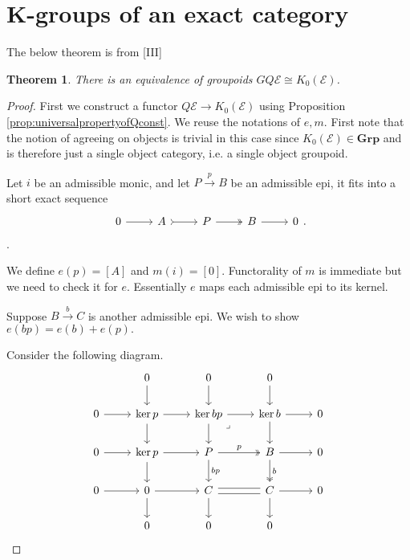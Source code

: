 \documentclass[12pt]{report}
\numberwithin{equation}{section}
\newtheorem{theorem}[dummy]{Theorem}
\begin{document}
		
		\section{K-groups of an exact category}
		
		The below theorem is from \cite{Goerss_Jardine_2009}[III]
		\begin{theorem}
			There is an equivalence of groupoids $GQ\mathcal{E} \cong K_0(\mathcal{E})$.
		\end{theorem}	
		\begin{proof}
			First we construct a functor \( Q\mathcal{E}\to K_0(\mathcal{E}) \) using Proposition \ref{prop:universalpropertyofQconst}. We reuse the notations of \( e,m \). First note that the notion of agreeing on objects is trivial in this case since \( K_0(\mathcal{E}) \in \mathbf{Grp} \) and is therefore just a single object category, i.e. a single object groupoid.
			 
			Let \( i \) be an admissible monic, and let \( P \xrightarrow{p}B \) be an admissible epi, it fits into a short exact sequence 
			\[\begin{tikzcd}
				0 & A & P & B & 0
				\arrow[from=1-1, to=1-2]
				\arrow[tail, from=1-2, to=1-3]
				\arrow[two heads, from=1-3, to=1-4]
				\arrow[from=1-4, to=1-5]
			\end{tikzcd}.\].
						
			We define \( e(p)=[A] \) and \( m(i)=[0] \). Functorality of \( m \) is immediate but we need to check it for \( e \). Essentially \( e \) maps each admissible epi to its kernel.
			
			
			
			Suppose \( B \xrightarrow{b}C \) is another admissible epi. We wish to show \( e(bp)=e(b)+e(p). \)
			
			Consider the following diagram.
			\[\begin{tikzcd}
				& 0 & 0 & 0 \\
				0 & {\ker p} & {\ker bp} & {\ker b} & 0 \\
				0 & {\ker p} & P & B & 0 \\
				0 & 0 & C & C & 0 \\
				& 0 & 0 & 0
				\arrow[from=1-2, to=2-2]
				\arrow[from=1-3, to=2-3]
				\arrow[from=1-4, to=2-4]
				\arrow[from=2-1, to=2-2]
				\arrow[from=2-2, to=2-3]
				\arrow[from=2-2, to=3-2]
				\arrow[from=2-3, to=2-4]
				\arrow[from=2-3, to=3-3]
				\arrow["\lrcorner"{anchor=center, pos=0.125}, draw=none, from=2-3, to=3-4]
				\arrow[from=2-4, to=2-5]
				\arrow[from=2-4, to=3-4]
				\arrow[from=3-1, to=3-2]
				\arrow[from=3-2, to=3-3]
				\arrow[from=3-2, to=4-2]
				\arrow["p", two heads, from=3-3, to=3-4]
				\arrow["bp", from=3-3, to=4-3]
				\arrow[from=3-4, to=3-5]
				\arrow["b", two heads, from=3-4, to=4-4]
				\arrow[from=4-1, to=4-2]
				\arrow[from=4-2, to=4-3]
				\arrow[from=4-2, to=5-2]
				\arrow[shift left, no head, from=4-3, to=4-4]
				\arrow[shift right, no head, from=4-3, to=4-4]
				\arrow[from=4-3, to=5-3]
				\arrow[from=4-4, to=4-5]
				\arrow[from=4-4, to=5-4]
			\end{tikzcd}\]
			

\end{proof}
\end{document}
